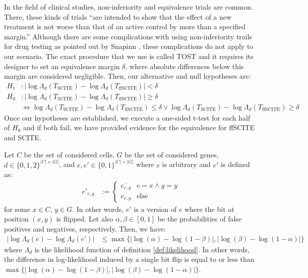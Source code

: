 In the field of clinical studies, non-inferiority and equivalence trials are common. There, these kinds of trials ``are intended to show that the effect of a new treatment is not worse than that of an active control by more than a specified margin.'' \cite{snapinn2000noninferiority} Although there are some complications with using non-inferiority trails for drug testing as pointed out by Snapinn \cite{snapinn2000noninferiority}, these complications do not apply to our scenario. The exact procedure that we use is called \acf{TOST} \cite{walker2011understanding} and it requires its designer to set an equivalence margin $\delta$, where absolute differences below this margin are considered negligible. Then, our alternative and null hypotheses are:
\begin{align*}
    H_1&: |\log\Lambda_d(T_\mathrm{SCITE}) - \log\Lambda_d(T_\mathrm{ffSCITE})| < \delta \\
    H_0&: |\log\Lambda_d(T_\mathrm{SCITE}) - \log\Lambda_d(T_\mathrm{ffSCITE})| \geq \delta \\
    &\Leftrightarrow \log\Lambda_d(T_\mathrm{SCITE}) - \log\Lambda_d(T_\mathrm{ffSCITE}) \leq \delta \vee \log\Lambda_d(T_\mathrm{SCITE}) - \log\Lambda_d(T_\mathrm{ffSCITE}) \geq \delta
\end{align*}
Once our hypotheses are established, we execute a one-sided t-test for each half of $H_0$ and if both fail, we have provided evidence for the equivalence for \ac{ffSCITE} and \ac{SCITE}.

\begin{lemma}
    \label{lem:bitflip}
    Let $C$ be the set of considered cells, $G$ be the set of considered genes, $d \in \{0,1,2\}^{|C| \times |G|}$, and $e, e' \in \{0,1\}^{|C| \times |G|}$ where $e$ is arbitrary and $e'$ is defined as:
    \begin{align*}
        e'_{c,g} &:= \begin{cases}
            \overline{e_{c,g}} & c = x \wedge g = y \\
            e_{c,g} & \text{else}
        \end{cases}
    \end{align*}
    for some $x \in C$, $y \in G$. In other words, $e'$ is a version of $e$ where the bit at position $(x,y)$ is flipped. Let also $\alpha, \beta \in [0,1]$ be the probabilities of false positives and negatives, respectively. Then, we have:
    \begin{align*}
        |\log\Lambda_d(e) - \log\Lambda_d(e')| &\leq \max\{|\log(\alpha) - \log(1-\beta)|, |\log(\beta) - \log(1-\alpha)|\}
    \end{align*}
    where $\Lambda_d$ is the likelihood function of definition \ref{def:likelihood}. In other words, the difference in log-likelihood induced by a single bit flip is equal to or less than $\max\{|\log(\alpha) - \log(1-\beta)|, |\log(\beta) - \log(1-\alpha)|\}$.
\end{lemma}


